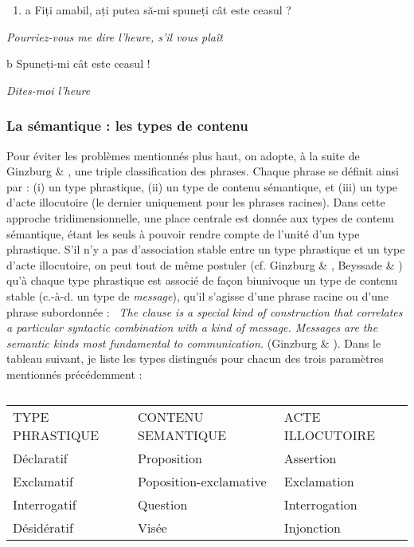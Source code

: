 \begin{enumerate}
\item \label{bkm:Ref299095055}a  Fiți amabil, ați putea să-mi spuneți cât este ceasul ?


\end{enumerate}
{\itshape
Pourriez-vous me dire l'heure, s'il vous plaît}

  b  Spuneți-mi cât este ceasul !~

{\itshape
Dites-moi l'heure}

\subsubsection{La sémantique : les types de contenu}
\label{bkm:Ref299091554}Pour éviter les problèmes mentionnés plus haut, on adopte, à la suite de Ginzburg \& \citet{Sag2000}, une triple classification des phrases. Chaque phrase se définit ainsi par : (i) un type phrastique, (ii) un type de contenu sémantique, et (iii) un type d'acte illocutoire\textbf{} (le dernier uniquement pour les phrases racines). Dans cette approche tridimensionnelle, une place centrale est donnée aux types de contenu sémantique, étant les seuls à pouvoir rendre compte de l'unité d'un type phrastique. S'il n'y a pas d'association stable entre un type phrastique et un type d'acte illocutoire, on peut tout de même postuler (cf. Ginzburg \& \citet{Sag2000}, Beyssade \& \citet{Marandin2006}) qu'à chaque type phrastique est associé de façon biunivoque un type de contenu stable (c.-à-d. un type de \textit{message}), qu'il s'agisse d'une phrase racine ou d'une phrase subordonnée : \textit{{\guillemotleft}~The clause is a special kind of construction that correlates a particular syntactic combination with a kind of message. Messages are the semantic kinds most fundamental to communication. {\guillemotright}} (Ginzburg \& \citet[10]{Sag2000}). Dans le tableau suivant, je liste les types distingués pour chacun des trois paramètres mentionnés précédemment : 


\begin{table}


\begin{tabular}{lll}

TYPE PHRASTIQUE & CONTENU SEMANTIQUE & ACTE ILLOCUTOIRE\\
Déclaratif & Proposition & Assertion\\
Exclamatif & Poposition-exclamative & Exclamation\\
Interrogatif & Question & Interrogation\\
Désidératif & Visée & Injonction\\
\end{tabular}

\caption{}
\end{table}

